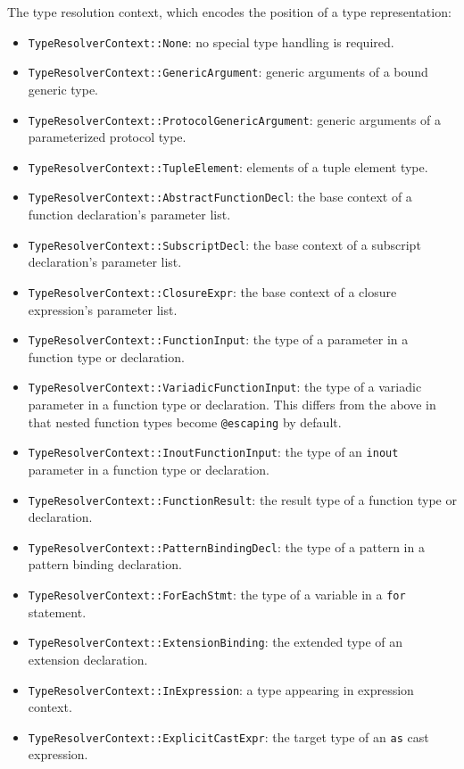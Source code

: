 \documentclass[../generics]{subfiles}
\begin{document}
The type resolution context, which encodes the position of a type representation:
\begin{itemize}
\item \texttt{TypeResolverContext::None}: no special type handling is required.
\item \texttt{TypeResolverContext::GenericArgument}: generic arguments of a bound generic type.
\item \texttt{TypeResolverContext::ProtocolGenericArgument}: generic arguments of a parameterized protocol type.
\item \texttt{TypeResolverContext::TupleElement}: elements of a tuple element type.
\item \texttt{TypeResolverContext::AbstractFunctionDecl}: the base context of a function declaration's parameter list.
\item \texttt{TypeResolverContext::SubscriptDecl}: the base context of a subscript declaration's parameter list.
\item \texttt{TypeResolverContext::ClosureExpr}: the base context of a closure expression's parameter list.
\item \texttt{TypeResolverContext::FunctionInput}: the type of a parameter in a function type or declaration.
\item \texttt{TypeResolverContext::VariadicFunctionInput}: the type of a variadic parameter in a function type or declaration. This differs from the above in that nested function types become \texttt{@escaping} by default.
\item \texttt{TypeResolverContext::InoutFunctionInput}: the type of an \texttt{inout} parameter in a function type or declaration.
\item \texttt{TypeResolverContext::FunctionResult}: the result type of a function type or declaration.
\item \texttt{TypeResolverContext::PatternBindingDecl}: the type of a pattern in a pattern binding declaration.
\item \texttt{TypeResolverContext::ForEachStmt}: the type of a variable in a \texttt{for} statement.
\item \texttt{TypeResolverContext::ExtensionBinding}: the extended type of an extension declaration.
\item \texttt{TypeResolverContext::InExpression}: a type appearing in expression context.
\item \texttt{TypeResolverContext::ExplicitCastExpr}: the target type of an \texttt{as} cast expression.

\end{itemize}
\end{document}

